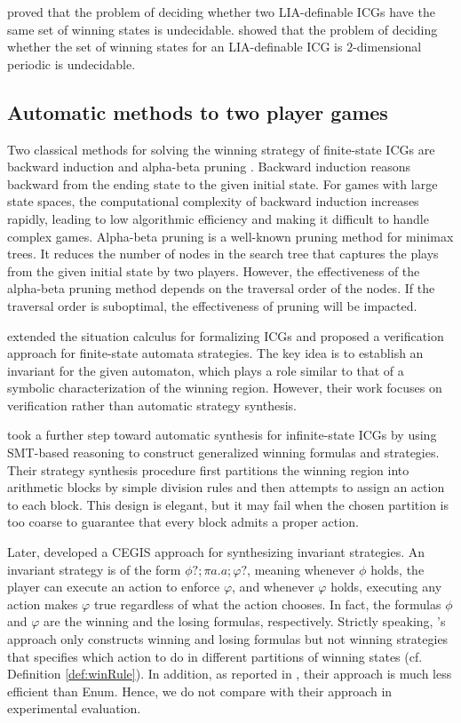 \documentclass[review]{elsarticle}
\begin{document}
\citet{LarW2013} proved that the problem of deciding whether two LIA-definable ICGs have the same set of winning states is undecidable.	
\citet{Lar2013} showed that the problem of deciding whether the set of winning states for an LIA-definable ICG is $2$-dimensional periodic is undecidable.	


\subsection{Automatic methods to two player games}
Two classical methods for solving the winning strategy of finite-state ICGs are backward induction \cite{Wat2002} and alpha-beta pruning \cite{BelM2020,HeiPS2008}.
Backward induction reasons backward from the ending state to the given initial state. 
For games with large state spaces, the computational complexity of backward induction increases rapidly, leading to low algorithmic efficiency and making it difficult to handle complex games. 
Alpha-beta pruning is a well-known pruning method for minimax trees. 
It reduces the number of nodes in the search tree that captures the plays from the given initial state by two players. 
However, the effectiveness of the alpha-beta pruning method depends on the traversal order of the nodes. 
If the traversal order is suboptimal, the effectiveness of pruning will be impacted. 


\citet{LuoL2019} extended the situation calculus for formalizing ICGs and proposed a verification approach for finite-state automata strategies. 
The key idea is to establish an invariant for the given automaton, which plays a role similar to that of a symbolic characterization of the winning region. 
However, their work focuses on verification rather than automatic strategy synthesis.

\citet{WuFXLQCR2020} took a further step toward automatic synthesis for infinite-state ICGs by using SMT-based reasoning to construct generalized winning formulas and strategies. 
Their strategy synthesis procedure first partitions the winning region into arithmetic blocks by simple division rules and then attempts to assign an action to each block. 
This design is elegant, but it may fail when the chosen partition is too coarse to guarantee that every block admits a proper action.


Later, \citet{LuoL2022} developed a CEGIS approach for synthesizing invariant strategies. 
An invariant strategy is of the form $\phi?; \pi a. a; \varphi?$, meaning whenever $\phi$ holds, the player can execute an action to enforce $\varphi$, and whenever $\varphi$ holds, executing any action makes $\varphi$ true regardless of what the action chooses.
In fact, the formulas $\phi$ and $\varphi$ are the winning and the losing formulas, respectively.
Strictly speaking, \citet{LuoL2022}'s approach only constructs winning and losing formulas but not winning strategies that specifies which action to do in different partitions of winning states (cf. Definition \ref{def:winRule}).
In addition, as reported in \cite{LuoL2022}, their approach is much less efficient than Enum.
Hence, we do not compare with their approach in experimental evaluation.
\end{document}
